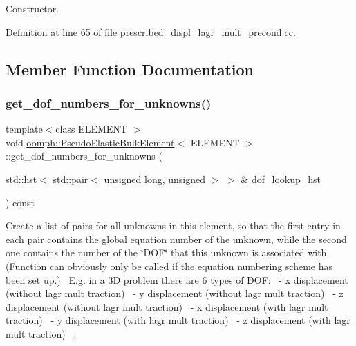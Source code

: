 Constructor. 



Definition at line 65 of file prescribed\+\_\+displ\+\_\+lagr\+\_\+mult\+\_\+precond.\+cc.



\subsection{Member Function Documentation}
\mbox{\label{classoomph_1_1PseudoElasticBulkElement_a8f1dc2011100324953293470a18f3080}} 
\subsubsection{\texorpdfstring{get\+\_\+dof\+\_\+numbers\+\_\+for\+\_\+unknowns()}{get\_dof\_numbers\_for\_unknowns()}}
{\footnotesize\ttfamily template$<$class E\+L\+E\+M\+E\+NT $>$ \\
void \hyperlink{classoomph_1_1PseudoElasticBulkElement}{oomph\+::\+Pseudo\+Elastic\+Bulk\+Element}$<$ E\+L\+E\+M\+E\+NT $>$\+::get\+\_\+dof\+\_\+numbers\+\_\+for\+\_\+unknowns (\begin{DoxyParamCaption}\item[{std\+::list$<$ std\+::pair$<$ unsigned long, unsigned $>$ $>$ \&}]{dof\+\_\+lookup\+\_\+list }\end{DoxyParamCaption}) const\hspace{0.3cm}{\ttfamily [inline]}}



Create a list of pairs for all unknowns in this element, so that the first entry in each pair contains the global equation number of the unknown, while the second one contains the number of the \char`\"{}\+D\+O\+F\char`\"{} that this unknown is associated with. (Function can obviously only be called if the equation numbering scheme has been set up.)~\newline
E.\+g. in a 3D problem there are 6 types of D\+OF\+:~ -\/ x displacement (without lagr mult traction)~ -\/ y displacement (without lagr mult traction)~ -\/ z displacement (without lagr mult traction)~ -\/ x displacement (with lagr mult traction)~ -\/ y displacement (with lagr mult traction)~ -\/ z displacement (with lagr mult traction)~\newline
. 



